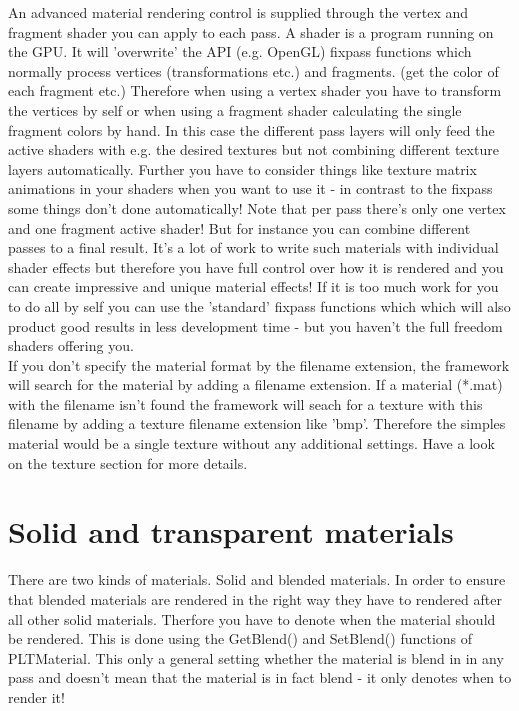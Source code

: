 An advanced material rendering control is supplied through the vertex and fragment shader you can apply
to each pass. A shader is a program running on the \ac{GPU}. It will 'overwrite' the \ac{API} (e.g. OpenGL)
fixpass functions which normally process vertices (transformations etc.) and fragments. (get the color
of each fragment etc.) Therefore when using a vertex shader you have to transform the vertices by self
or when using a fragment shader calculating the single fragment colors by hand. In this case the
different pass layers will only feed the active shaders with e.g. the desired textures but not combining
different texture layers automatically. Further you have to consider things like texture matrix animations
in your shaders when you want to use it - in contrast to the fixpass some things don't done automatically!
Note that per pass there's only one vertex and one fragment active shader! But for instance you can
combine different passes to a final result. It's a lot of work to write such materials with individual
shader effects but therefore you have full control over how it is rendered and you can create impressive
and unique material effects! If it is too much work for you to do all by self you can use the 'standard'
fixpass functions which which will also product good results in less development time - but you haven't
the full freedom shaders offering you.\\

If you don't specify the material format by the filename extension, the framework will search for the material
by adding a filename extension. If a material (*.mat) with the filename isn't found the framework will seach for a 
texture with this filename by adding a texture filename extension like 'bmp'. Therefore the simples
material would be a single texture without any additional settings. Have a look on the texture section
for more details.



\section{Solid and transparent materials}
There are two kinds of materials. Solid and blended materials. In order to ensure that blended
materials are rendered in the right way they have to rendered after all other solid materials.
Therfore you have to denote when the material should be rendered. This is done using the GetBlend()
and SetBlend() functions of PLTMaterial. This only a general setting whether the material is blend
in in any pass and doesn't mean that the material is in fact blend - it only denotes when to
render it!




